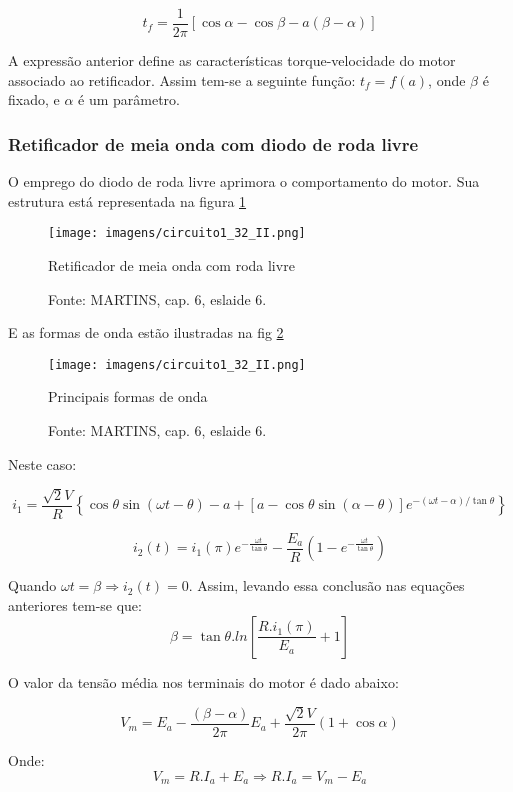 \[t_{f} = \frac{1}{2\pi}\left[\cos{\alpha} - \cos{\beta} - a\left(\beta - \alpha\right)\right]\]

A expressão anterior define as características torque-velocidade do motor associado ao retificador. Assim tem-se a seguinte função: $t_{f} = f(a)$, onde $\beta$ é fixado, e $\alpha$ é um parâmetro.

\subsubsection{Retificador de meia onda com diodo de roda livre}

O emprego do diodo de roda livre aprimora o comportamento do motor. Sua estrutura está representada na figura \ref{fig:C1-32-II}

\begin{figure}[ht!]
\center
\texttt{[image: imagens/circuito1\_32\_II.png]}
\caption{\label{fig:C1-32-II} Retificador de meia onda com roda livre}
\caption*{Fonte: MARTINS, cap. 6, eslaide 6.}
\end{figure}

E as formas de onda estão ilustradas na fig \ref{fig:C1-32-III}

\begin{figure}[ht!]
\center
\texttt{[image: imagens/circuito1\_32\_II.png]}
\caption{\label{fig:C1-32-III} Principais formas de onda}
\caption*{Fonte: MARTINS, cap. 6, eslaide 6.}
\end{figure}

Neste caso:

\[i_{1} = \frac{\sqrt{2}V}{R}\left\{\cos{\theta}\sin\left(\omega{t} - \theta\right) - a + \left[a - \cos{\theta}\sin{\left(\alpha - \theta\right)}\right]e^{-\left(\omega{t} - \alpha\right)/\tan{\theta}}\right\}\]

\[i_{2}(t) = i_{1}(\pi)e^{-\frac{\omega{t}}{\tan{\theta}}} - \frac{E_{a}}{R}\left(1 - e^{-\frac{\omega{t}}{\tan{\theta}}}\right)\]

Quando $\omega{t} = \beta \Rightarrow i_{2}(t) = 0$. Assim, levando essa conclusão nas equações anteriores tem-se que:
\[\beta = \tan{\theta}.ln\left[\frac{R.i_{1}(\pi)}{E_{a}} + 1\right]\]

O valor da tensão média nos terminais do motor é dado abaixo:

\[V_{m} = E_{a} - \frac{(\beta - \alpha)}{2\pi}E_{a} + \frac{\sqrt{2}V}{2\pi}\left(1 + \cos{\alpha}\right)\]

Onde:
\[V_{m} = R.I_{a} + E_{a} \Rightarrow R.I_{a} = V_{m} - E_{a}\]

